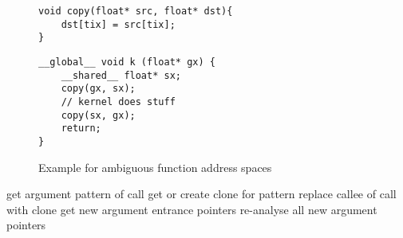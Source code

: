 \begin{figure}[t]
	\begin{minipage}{0.45\textwidth}
		
		\begin{lstlisting}[style=c]
void copy(float* src, float* dst){
	dst[tix] = src[tix];
}\end{lstlisting}
	\end{minipage}\hfill
	\begin{minipage}{0.45\textwidth}
			\begin{lstlisting}[style=c]
__global__ void k (float* gx) {
	__shared__ float* sx;
	copy(gx, sx);
	// kernel does stuff
	copy(sx, gx);
	return;
}\end{lstlisting}
	\end{minipage}\hfill
\begin{minipage}{\textwidth}
	
\end{minipage}\vfill
	\caption{Example for ambiguous function address spaces}
	\label{func-vers}
\end{figure}
\begin{algorithm}[t]
	 {
		get argument pattern of call\;
		get or create clone for pattern\;
		replace callee of call with clone\;
		get new argument entrance pointers\;
	}
	 {
		re-analyse all new argument pointers\;
	}
	\caption{Algorithm for function specialization}
	\label{anal-algo}
\end{algorithm}
